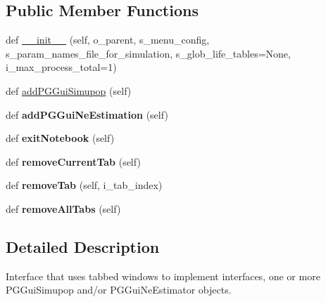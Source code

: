 \subsection*{Public Member Functions}
\begin{DoxyCompactItemize}
\item 
def \hyperlink{classnegui_1_1pghostnotebook_1_1PGHostNotebook_a6194250626f96f1f6c2b6ccd48aa5e92}{\+\_\+\+\_\+init\+\_\+\+\_\+} (self, o\+\_\+parent, s\+\_\+menu\+\_\+config, s\+\_\+param\+\_\+names\+\_\+file\+\_\+for\+\_\+simulation, s\+\_\+glob\+\_\+life\+\_\+tables=None, i\+\_\+max\+\_\+process\+\_\+total=1)
\item 
def \hyperlink{classnegui_1_1pghostnotebook_1_1PGHostNotebook_af595ed4592e623ef403a5e9e7c1e930e}{add\+P\+G\+Gui\+Simupop} (self)
\item 
def {\bfseries add\+P\+G\+Gui\+Ne\+Estimation} (self)\hypertarget{classnegui_1_1pghostnotebook_1_1PGHostNotebook_a9242f6b6eff030ac5de8db425e1585f9}{}\label{classnegui_1_1pghostnotebook_1_1PGHostNotebook_a9242f6b6eff030ac5de8db425e1585f9}

\item 
def {\bfseries exit\+Notebook} (self)\hypertarget{classnegui_1_1pghostnotebook_1_1PGHostNotebook_a6b399a4627a80141332553e637eab595}{}\label{classnegui_1_1pghostnotebook_1_1PGHostNotebook_a6b399a4627a80141332553e637eab595}

\item 
def {\bfseries remove\+Current\+Tab} (self)\hypertarget{classnegui_1_1pghostnotebook_1_1PGHostNotebook_a722efece7ca42a910310c05dd77a282b}{}\label{classnegui_1_1pghostnotebook_1_1PGHostNotebook_a722efece7ca42a910310c05dd77a282b}

\item 
def {\bfseries remove\+Tab} (self, i\+\_\+tab\+\_\+index)\hypertarget{classnegui_1_1pghostnotebook_1_1PGHostNotebook_acd199bca00bb076546ff1f2b3214cf1a}{}\label{classnegui_1_1pghostnotebook_1_1PGHostNotebook_acd199bca00bb076546ff1f2b3214cf1a}

\item 
def {\bfseries remove\+All\+Tabs} (self)\hypertarget{classnegui_1_1pghostnotebook_1_1PGHostNotebook_a1ee591325aa0128d47f46b9faf5ebf9a}{}\label{classnegui_1_1pghostnotebook_1_1PGHostNotebook_a1ee591325aa0128d47f46b9faf5ebf9a}

\end{DoxyCompactItemize}


\subsection{Detailed Description}
\begin{DoxyVerb}Interface that uses tabbed windows to implement interfaces, one or more PGGuiSimupop and/or PGGuiNeEstimator
objects.
\end{DoxyVerb}
 

